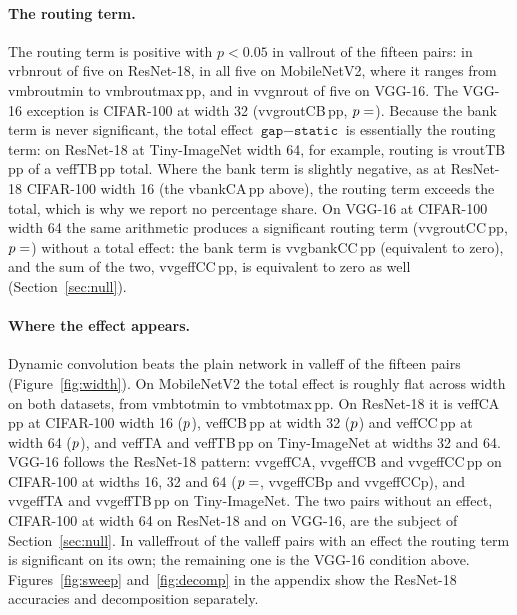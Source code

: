 \documentclass[10pt,a4paper]{article}
\newcommand{\V}[1]{\csname v#1\endcsname}
\begin{document}
\paragraph{The routing term.} The routing term is positive with $p<0.05$
in \V{allrout} of the fifteen pairs: in \V{rbnrout} of five on ResNet-18,
in all five on MobileNetV2, where it ranges from \V{mbroutmin} to
\V{mbroutmax}\,pp, and in \V{vgnrout} of five on VGG-16. The VGG-16
exception is CIFAR-100 at width 32 (\V{vgroutCB}\,pp, $p=\V{vgroutCBp}$).
Because the bank term is never significant, the total effect
$\texttt{gap}-\texttt{static}$ is essentially the routing term: on
ResNet-18 at Tiny-ImageNet width 64, for example, routing is
\V{routTB}\,pp of a \V{effTB}\,pp total. Where the bank term is slightly
negative, as at ResNet-18 CIFAR-100 width 16 (the \V{bankCA}\,pp above),
the routing term exceeds the total, which is why we report no percentage
share. On VGG-16 at CIFAR-100 width 64 the same arithmetic produces a
significant routing term (\V{vgroutCC}\,pp, $p=\V{vgroutCCp}$) without a
total effect: the bank term is \V{vgbankCC}\,pp (equivalent to zero), and
the sum of the two, \V{vgeffCC}\,pp, is equivalent to zero as well
(Section~\ref{sec:null}).

\paragraph{Where the effect appears.} Dynamic convolution beats the plain
network in \V{alleff} of the fifteen pairs (Figure~\ref{fig:width}). On
MobileNetV2 the total effect is roughly flat across width on both
datasets, from \V{mbtotmin} to \V{mbtotmax}\,pp. On ResNet-18 it is
\V{effCA}\,pp at CIFAR-100 width 16 ($p\V{effCAp}$), \V{effCB}\,pp at width
32 ($p\V{effCBp}$) and \V{effCC}\,pp at width 64 ($p\V{effCCp}$), and
\V{effTA} and \V{effTB}\,pp on Tiny-ImageNet at widths 32 and 64. VGG-16
follows the ResNet-18 pattern: \V{vgeffCA}, \V{vgeffCB} and
\V{vgeffCC}\,pp on CIFAR-100 at widths 16, 32 and 64
($p=\V{vgeffCAp}$, \V{vgeffCBp} and \V{vgeffCCp}), and \V{vgeffTA} and
\V{vgeffTB}\,pp on Tiny-ImageNet. The two pairs without an effect, CIFAR-100
at width 64 on ResNet-18 and on VGG-16, are the subject of
Section~\ref{sec:null}. In \V{alleffrout} of the \V{alleff} pairs with an
effect the routing term is significant on its own; the remaining one is
the VGG-16 condition above. Figures~\ref{fig:sweep} and~\ref{fig:decomp}
in the appendix show the ResNet-18 accuracies and decomposition
separately.
\end{document}
